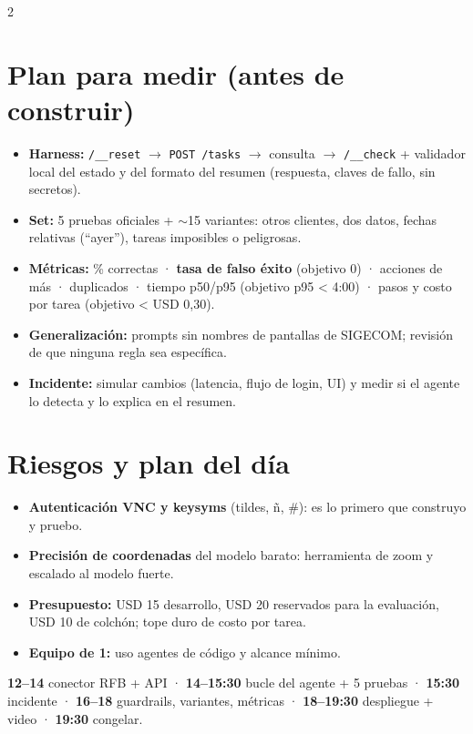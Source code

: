 \documentclass[10pt]{extarticle}
\newcommand{\cod}[1]{\texttt{\footnotesize #1}}
\begin{document}
\begin{multicols}{2}
\section{Plan para medir (antes de construir)}
\begin{itemize}
\item \textbf{Harness:} \cod{/\_\_reset} $\rightarrow$ \cod{POST /tasks} $\rightarrow$ consulta $\rightarrow$ \cod{/\_\_check} + validador local del estado y del formato del resumen (respuesta, claves de fallo, sin secretos).
\item \textbf{Set:} 5 pruebas oficiales + $\sim$15 variantes: otros clientes, dos datos, fechas relativas (``ayer''), tareas imposibles o peligrosas.
\item \textbf{Métricas:} \% correctas · \textbf{tasa de falso éxito} (objetivo 0) · acciones de más · duplicados · tiempo p50/p95 (objetivo p95 < 4:00) · pasos y costo por tarea (objetivo < USD 0,30).
\item \textbf{Generalización:} prompts sin nombres de pantallas de SIGECOM; revisión de que ninguna regla sea específica.
\item \textbf{Incidente:} simular cambios (latencia, flujo de login, UI) y medir si el agente lo detecta y lo explica en el resumen.
\end{itemize}

\columnbreak
\section{Riesgos y plan del día}
\begin{itemize}
\item \textbf{Autenticación VNC y keysyms} (tildes, ñ, \#): es lo primero que construyo y pruebo.
\item \textbf{Precisión de coordenadas} del modelo barato: herramienta de zoom y escalado al modelo fuerte.
\item \textbf{Presupuesto:} USD 15 desarrollo, USD 20 reservados para la evaluación, USD 10 de colchón; tope duro de costo por tarea.
\item \textbf{Equipo de 1:} uso agentes de código y alcance mínimo.
\end{itemize}
\textbf{12--14} conector RFB + API · \textbf{14--15:30} bucle del agente + 5 pruebas · \textbf{15:30} incidente · \textbf{16--18} guardrails, variantes, métricas · \textbf{18--19:30} despliegue + video · \textbf{19:30} congelar.
\end{multicols}
\end{document}
